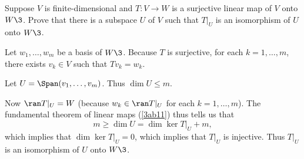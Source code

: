 \exercise
Suppose $V$ is finite-dimensional and $T \colon V \to W$ is a surjective linear map of $V$ onto $W\3$.  Prove that there is a subspace $U$ of $V$ such that $T|_U$ is an isomorphism of $U$ onto $W\3$.

\begin{Solution}
Let $w_1, \dots, w_m$ be a basis of $W\3$. Because $T$ is surjective, for each $k = 1, \dots, m$, there exists $v_k \in V$ such that $Tv_k = w_k$.

Let $U = \Span(v_1, \dots, v_m)$. Thus $\dim U \le m$.

Now $\ran T|_U = W$ (because $w_k \in \ran T|_U$ for each $k = 1, \dots, m$). The fundamental theorem of linear maps (\ref{3ab11}) thus tells us that
\[
m \ge \dim U = \dim \ker T|_U + m,
\]
which implies that $\dim \ker T|_U = 0$, which implies that $T|_U$ is injective. Thus $T|_U$ is an isomorphism of $U$ onto $W\3$.
\end{Solution}

